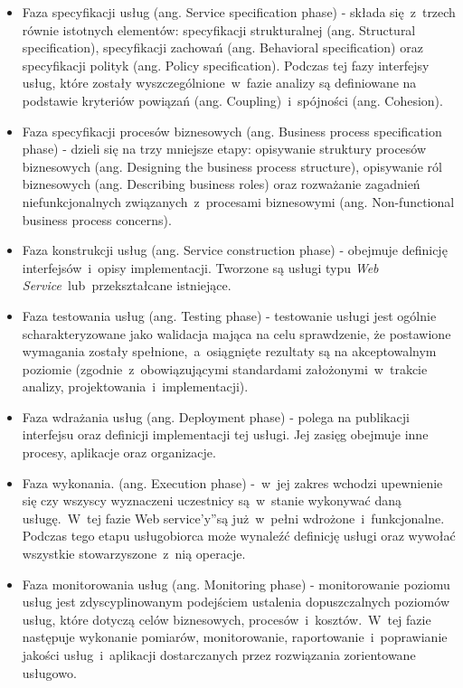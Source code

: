 \begin{itemize}
\item{Faza specyfikacji usług (ang. Service specification phase) - składa się~z~trzech równie istotnych elementów: specyfikacji strukturalnej (ang. Structural specification), specyfikacji zachowań (ang. Behavioral specification) oraz specyfikacji polityk (ang. Policy specification). Podczas tej fazy  interfejsy usług, które zostały wyszczególnione~w~fazie analizy są definiowane na podstawie kryteriów powiązań (ang. Coupling)~i~spójności (ang. Cohesion).}

\item{Faza specyfikacji procesów biznesowych (ang. Business process specification phase) - dzieli się na trzy mniejsze etapy: opisywanie struktury procesów biznesowych (ang. Designing the business process structure), opisywanie ról biznesowych (ang. Describing business roles) oraz rozważanie zagadnień niefunkcjonalnych związanych~z~procesami biznesowymi (ang. Non-functional business process concerns).}

\item{Faza konstrukcji usług (ang. Service construction phase) - obejmuje definicję interfejsów~i~opisy implementacji. Tworzone są usługi typu \emph{Web Service}~lub~przekształcane istniejące.}

\item{Faza testowania usług (ang. Testing phase) - testowanie usługi jest ogólnie scharakteryzowane jako walidacja mająca na celu sprawdzenie, że postawione wymagania zostały spełnione,~a~osiągnięte rezultaty są na akceptowalnym poziomie (zgodnie~z~obowiązującymi standardami założonymi~w~trakcie analizy, projektowania~i~implementacji).} 

\item{Faza wdrażania usług (ang. Deployment phase) - polega na publikacji interfejsu oraz definicji implementacji tej usługi. Jej zasięg obejmuje inne procesy, aplikacje oraz organizacje.}

\item{Faza wykonania. (ang. Execution phase) -~w~jej zakres wchodzi upewnienie się czy wszyscy wyznaczeni uczestnicy są~w~stanie wykonywać daną usługę.~W~tej fazie \quotedblbase Web service'y\textquotedblright są już~w~pełni wdrożone~i~funkcjonalne. Podczas tego etapu usługobiorca może wynaleźć definicję usługi oraz wywołać wszystkie stowarzyszone~z~nią operacje.}

\item{Faza monitorowania usług (ang. Monitoring phase) - monitorowanie poziomu usług jest zdyscyplinowanym podejściem ustalenia dopuszczalnych poziomów usług, które dotyczą celów biznesowych, procesów~i~kosztów.~W~tej fazie następuje wykonanie pomiarów, monitorowanie, raportowanie~i~poprawianie jakości usług~i~aplikacji dostarczanych przez rozwiązania zorientowane usługowo. \cite{PapaZog}}
\end{itemize}

